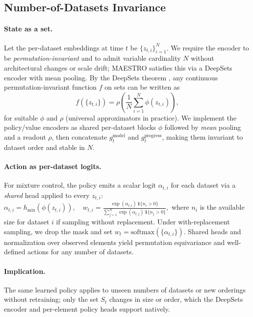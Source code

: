 \documentclass[11pt]{article}
\newcommand{\1}{\mathbf{1}}
\newcommand{\MAESTRO}{\textsc{MAESTRO}\xspace}
\begin{document}
\subsection{Number-of-Datasets Invariance}\label{sec:invariance}
\paragraph{State as a set.}
Let the per-dataset embeddings at time $t$ be $\{z_{t,i}\}_{i=1}^N$.
We require the encoder to be \emph{permutation-invariant} and to admit variable cardinality $N$ without architectural changes or scale drift; \MAESTRO{} satisfies this via a DeepSets encoder with mean pooling.
By the DeepSets theorem \citep{zaheer2017deepsets}, any continuous permutation-invariant function $f$ on sets can be written as
\begin{equation}
f(\{z_{t,i}\})=\rho\!\left(\frac{1}{N}\sum_{i=1}^N \phi(z_{t,i})\right),
\label{eq:deepsets}
\end{equation}
for suitable $\phi$ and $\rho$ (universal approximators in practice).
We implement the policy/value encoders as shared per-dataset blocks $\phi$ followed by \emph{mean} pooling and a readout $\rho$, then concatenate $g^{\text{model}}_t$ and $g^{\text{progress}}_t$, making them invariant to dataset order and stable in $N$.

\paragraph{Action as per-dataset logits.}
For mixture control, the policy emits a scalar logit $\alpha_{t,i}$ for each dataset via a \emph{shared} head applied to every $z_{t,i}$:
\(
\alpha_{t,i} = h_{\text{mix}}(\phi(z_{t,i})),\quad
w_{t,i}=\frac{\exp(\alpha_{t,i})\,\1\{n_i>0\}}{\sum_{j=1}^N \exp(\alpha_{t,j})\,\1\{n_j>0\}},
\)
where $n_i$ is the available size for dataset $i$ if sampling without replacement. Under with-replacement sampling,
we drop the mask and set $w_t=\mathrm{softmax}(\{\alpha_{t,i}\})$. Shared heads and normalization over observed elements yield permutation equivariance and well-defined actions for any number of datasets.

\paragraph{Implication.}
The same learned policy applies to unseen numbers of datasets or new orderings without retraining; only the set $S_t$ changes in size or order, which the DeepSets encoder and per-element policy heads support natively.
\end{document}
